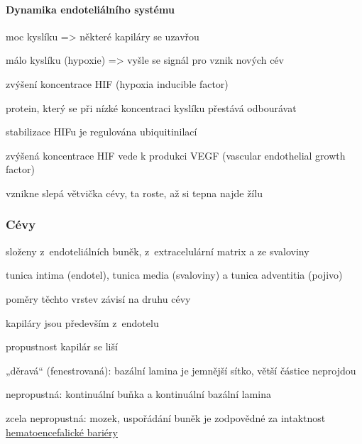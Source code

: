 \documentclass[DIV=8]{scrreprt}
\begin{document}
\paragraph{Dynamika endoteliálního systému}
\begin{myItemize}[nosep]
    \item moc kyslíku => některé kapiláry se uzavřou
    \item málo kyslíku (hypoxie) => vyšle se signál pro vznik nových cév
\begin{myItemize}[nosep]
    \item zvýšení koncentrace HIF (hypoxia inducible factor)
\begin{myItemize}[nosep]
    \item protein, který se při nízké koncentraci kyslíku přestává odbourávat
    \item stabilizace HIFu je regulována ubiquitinilací
\end{myItemize}

    \item zvýšená koncentrace HIF vede k produkci VEGF (vascular endothelial growth factor)
    \item vznikne slepá větvička cévy, ta roste, až si tepna najde žílu
\end{myItemize}

\end{myItemize}



\subsubsection{Cévy} \label{Cévy}


\begin{myItemize}[nosep]
    \item složeny z endoteliálních buněk, z extracelulární matrix a ze svaloviny
\begin{myItemize}[nosep]
    \item tunica intima (endotel), tunica media (svaloviny) a tunica adventitia (pojivo)
\end{myItemize}

    \item poměry těchto vrstev závisí na druhu cévy
\begin{myItemize}[nosep]
    \item kapiláry jsou především z endotelu
    \item propustnost kapilár se liší
\begin{myItemize}[nosep]
    \item „děravá“ (fenestrovaná): bazální lamina je jemnější sítko, větší částice neprojdou
    \item nepropustná: kontinuální buňka a kontinuální bazální lamina
    \item zcela nepropustná: mozek, uspořádání buněk je zodpovědné za intaktnost \hyperref[Hematoencefalická bariéra]{hematoencefalické bariéry}
\end{myItemize}

\end{myItemize}

\end{myItemize}
\end{document}
